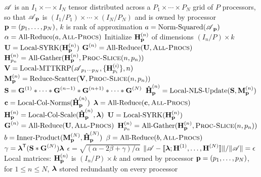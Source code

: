\begin{algorithm}
\caption{$(\CPl,\epsilon) = \text{Par-NNCP}(\TA,k)$}
\label{alg:2D}
\begin{algorithmic}[1]
\Require $\TA$ is an $I_1\times \cdots \times I_N$ tensor distributed across a $P_1\times \cdots \times P_N$ grid of $P$ processors, so that $\TA_{\V{p}}$ is $(I_1/P_1)\times \cdots \times (I_N/P_N)$ and is owned by processor $\V{p}=(p_1,\dots,p_N)$, $k$ is rank of approximation
\State {}
\State $a = \text{Norm-Squared}(\TA_{\V{p}})$
\State $\alpha = \text{All-Reduce}(a,\textsc{All-Procs})$
	\State Initialize $\Mn{H}{n}_{\V{p}}$ of dimensions $(I_n/P)\times k$ 
	\State $\M{U} = \text{Local-SYRK}(\Mn{H}{n}_{\V{p}})$
	\State $\Mn{G}{n} = \text{All-Reduce}(\M{U},\textsc{All-Procs})$
	\State $\Mn{H}{n}_{p_n} = \text{All-Gather}(\Mn{H}{n}_{\V{p}},\textsc{Proc-Slice}(n,\VE{p}{n}))$
\EndFor
\State {}
	\State {}
	\State {}
	\State $\M{V} = \text{Local-MTTKRP}(\TA_{p_1\cdots p_N},\{\Mn{H}{i}_{p_i}\},n)$
		\label{line:locMTTKRP}
	\State $\Mn{M}{n}_{\V{p}} = \text{Reduce-Scatter}(\M{V},\textsc{Proc-Slice}(n,\VE{p}{n}))$ 
		\label{line:reduce-scatter}
	\State $\M{S} = \Mn{G}{1} \Hada \cdots \Hada \Mn{G}{n-1} \Hada \Mn{G}{n+1} \Hada \cdots \Hada \Mn{G}{N}$
		\label{line:hadamard}
	\State $\Mn[\hat]{H}{n}_{\V{p}} = \text{Local-NLS-Update}(\M{S},\Mn{M}{n}_{\V{p}})$
		\label{line:locNLS}
	\State {}
	\State $\V{c} = \text{Local-Col-Norms}(\Mn[\hat]{H}{n}_{\V{p}})$
	\State $\V{\lambda} = \text{All-Reduce}(\V{c},\textsc{All-Procs})$
	\State $\Mn{H}{n}_{\V{p}} = \text{Local-Col-Scale}(\Mn[\hat]{H}{n}_{\V{p}},\V{\lambda})$
	\State {}
	\State $\M{U} = \text{Local-SYRK}(\Mn{H}{n}_{\V{p}})$
		\label{line:locSYRK}
	\State $\Mn{G}{n} = \text{All-Reduce}(\M{U},\textsc{All-Procs})$
		\label{line:all-reduce}
	\State $\Mn{H}{n}_{p_n} = \text{All-Gather}(\Mn{H}{n}_{\V{p}},\textsc{Proc-Slice}(n,\VE{p}{n}))$
		\label{line:all-gather}
	\EndFor
	\State {}
	\State $b = \text{Inner-Product}(\Mn{M}{N}_{\V{p}},\Mn[\hat]{H}{N}_{\V{p}})$
	\State $\beta = \text{All-Reduce}(b,\textsc{All-Procs})$
	\State $\gamma = \V{\lambda}^\Tra (\M{S} \Hada \Mn{G}{N}) \V{\lambda}$
	\State $\epsilon = \sqrt{(\alpha-2\beta+\gamma)/\alpha}$ 
\EndWhile
\Ensure $\|\TA - \dsquare{\V{\lambda}; \Mn{H}{1},\dots,\Mn{H}{N}}\| /\|\TA\| = \epsilon$
\Ensure Local matrices: $\Mn{H}{n}_{\V{p}}$ is $(I_n/P)\times k$ and owned by processor $\V{p}=(p_1,\dots,p_N)$, for $1\leq n \leq N$, $\V{\lambda}$ stored redundantly on every processor
\end{algorithmic}
\end{algorithm}